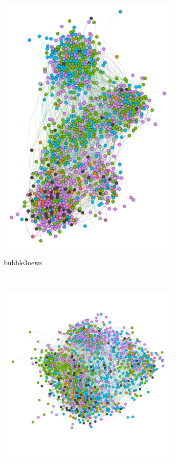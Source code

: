 \begin{figure}
  ~
  \begin{subfigure}[t]{0.35\textwidth}
    \includegraphics[width=\textwidth]{img/dim5_news.pdf}
    \label{fig:bubble5news}
    \caption{bubble3news}
  \end{subfigure}
  ~
  \begin{subfigure}[t]{0.35\textwidth}
    \includegraphics[width=\textwidth]{img/dim7_news.pdf}

\end{subfigure}
\end{figure}
